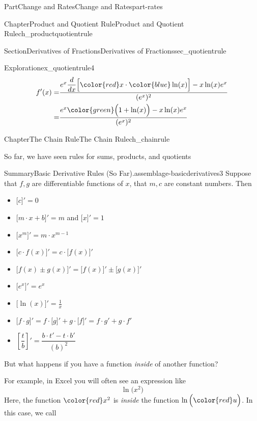 \documentclass[oneside,10pt,]{tufte-book}
\numberwithin{equation}{chapter}
\newcommand{\red}[1]{   {\color{red}   #1}   }
\newcommand{\blue}[1]{  {\color{blue}  #1}  }
\newcommand{\green}[1]{ {\color{green} #1} }
\newcommand{\ddx}[1]{ \dfrac{d}{dx} \Big[ #1 \Big]  }
\newcommand{\D}[1]{ \Big[ #1 \Big]'  }
\newcommand{\amp}{&}
\begin{document}
\begin{partptx}{Part}{Change and Rates}{}{Change and Rates}{}{}{part-rates}
\begin{chapterptx}{Chapter}{Product and Quotient Rule}{}{Product and Quotient Rule}{}{}{ch_productquotientrule}
\begin{sectionptx}{Section}{Derivatives of Fractions}{}{Derivatives of Fractions}{}{}{sec_quotientrule}
\begin{exploration}{Exploration}{}{ex_quotientrule4}
\begin{align*}
f'(x) = \amp \dfrac{ e^x  \ddx{ \red{x}\cdot \blue{\ln(x)} }  -  x\ln(x) e^x }{( e^x )^2}\\
= \amp \dfrac{ e^x  \green{\Big(1 + \ln(x)\Big)}  -  x\ln(x) e^x }{( e^x )^2}
\end{align*}
%
\end{exploration}%
\end{sectionptx}
\end{chapterptx}
%
\typeout{************************************************}
\typeout{************************************************}
%
\begin{chapterptx}{Chapter}{The Chain Rule}{}{The Chain Rule}{}{}{ch_chainrule}
\renewcommand*{\chaptername}{Chapter}
\begin{introduction}{}%
So far, we have seen rules for sums, products, and quotients \begin{assemblage}{Summary}{Basic Derivative Rules (So Far).}{assemblage-basicderivatives3}%
Suppose that \(f,g\) are differentiable functions of \(x\), that \(m,c\) are constant numbers.  Then%
\begin{itemize}[label=\textbullet]
\item{}\(\displaystyle \D{c}=0\)%
\item{}\(\D{m\cdot x+b}=m\) and \(\D{x} = 1\)%
\item{}\(\displaystyle \D{x^m}=m\cdot x^{m-1}\)%
\item{}\(\displaystyle \D{ c\cdot f(x)}=c\cdot \D{f(x)}\)%
\item{}\(\displaystyle \D{f(x) \pm g(x)} = \D{f(x)} \pm \D{g(x)}\)%
\item{}\(\displaystyle \D{ e^x } = e^x \)%
\item{}\(\displaystyle \D{ \ln(x) } = \frac{1}{x}\)%
\item{}\(\displaystyle \Big[f\cdot g\Big]' = f\cdot \Big[g\Big]' + g\cdot \Big[f\Big]' = f\cdot g' + g\cdot f' \)%
\item{}\(\displaystyle \left[\dfrac{t}{b}\right]' = \dfrac{b\cdot t' - t\cdot b'}{(b)^2} \)%
\end{itemize}
%
\end{assemblage}
%
\par
But what happens if you have a function \emph{inside} of another function?%
\par
For example, in Excel you will often see an expression like%
\begin{equation*}
\ln\Big( x^2 \Big)
\end{equation*}
Here, the function \(\red{x^2}\) is \emph{inside} the function \(\ln\Big(\red{u}\Big)\). In this case, we call%

\end{introduction}
\end{chapterptx}
\end{partptx}
\end{document}
